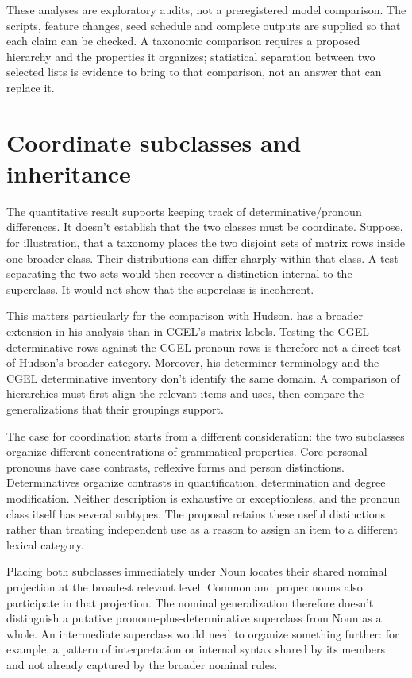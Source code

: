 \documentclass[12pt]{article}
\begin{document}
These analyses are exploratory audits, not a preregistered model comparison. The scripts, feature changes, seed schedule and complete outputs are supplied so that each claim can be checked. A taxonomic comparison requires a proposed hierarchy and the properties it organizes; statistical separation between two selected lists is evidence to bring to that comparison, not an answer that can replace it.

\section{Coordinate subclasses and inheritance}\label{sec:inheritance}

The quantitative result supports keeping track of determinative/pronoun differences. It doesn't establish that the two classes must be coordinate. Suppose, for illustration, that a taxonomy places the two disjoint sets of matrix rows inside one broader class. Their distributions can differ sharply within that class. A test separating the two sets would then recover a distinction internal to the superclass. It would not show that the superclass is incoherent.

This matters particularly for the comparison with Hudson.  has a broader extension in his analysis than in CGEL's matrix labels. Testing the CGEL determinative rows against the CGEL pronoun rows is therefore not a direct test of Hudson's broader category. Moreover, his determiner terminology and the CGEL determinative inventory don't identify the same domain. A comparison of hierarchies must first align the relevant items and uses, then compare the generalizations that their groupings support.

The case for coordination starts from a different consideration: the two subclasses organize different concentrations of grammatical properties. Core personal pronouns have case contrasts, reflexive forms and person distinctions. Determinatives organize contrasts in quantification, determination and degree modification. Neither description is exhaustive or exceptionless, and the pronoun class itself has several subtypes. The proposal retains these useful distinctions rather than treating independent use as a reason to assign an item to a different lexical category.

Placing both subclasses immediately under Noun locates their shared nominal projection at the broadest relevant level. Common and proper nouns also participate in that projection. The nominal generalization therefore doesn't distinguish a putative pronoun-plus-determinative superclass from Noun as a whole. An intermediate superclass would need to organize something further: for example, a pattern of interpretation or internal syntax shared by its members and not already captured by the broader nominal rules.
\end{document}
